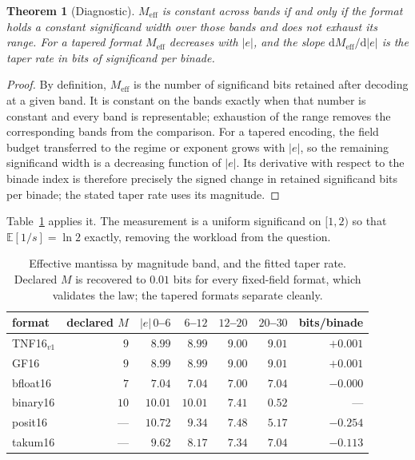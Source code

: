 \documentclass[11pt]{article}
\newtheorem{theorem}{Theorem}
\theoremstyle{definition}
\begin{document}
\begin{theorem}[Diagnostic]\label{thm:diag}
$M_{\mathrm{eff}}$ is constant across bands if and only if the format holds a
constant significand width over those bands and does not exhaust its range. For a
tapered format $M_{\mathrm{eff}}$ decreases with $|e|$, and the slope
$\mathrm{d}M_{\mathrm{eff}}/\mathrm{d}|e|$ is the taper rate in bits of
significand per binade.
\end{theorem}
\begin{proof}
By definition, $M_{\mathrm{eff}}$ is the number of significand bits retained
after decoding at a given band. It is constant on the bands exactly when that
number is constant and every band is representable; exhaustion of the range
removes the corresponding bands from the comparison. For a tapered encoding,
the field budget transferred to the regime or exponent grows with $|e|$, so the
remaining significand width is a decreasing function of $|e|$. Its derivative
with respect to the binade index is therefore precisely the signed change in
retained significand bits per binade; the stated taper rate uses its magnitude.
\end{proof}

Table~\ref{tab:meff} applies it. The measurement is a uniform significand on
$[1,2)$ so that $\mathbb{E}[1/s] = \ln 2$ exactly, removing the workload from the
question.

\begin{table}[t]\centering
\caption{Effective mantissa by magnitude band, and the fitted taper rate. Declared
$M$ is recovered to $0.01$ bits for every fixed-field format, which validates the
law; the tapered formats separate cleanly.}
\label{tab:meff}
\begin{tabular}{lrrrrrr}
\toprule
format & declared $M$ & $|e|\,0$--$6$ & $6$--$12$ & $12$--$20$ & $20$--$30$ & bits/binade \\
\midrule
TNF16$_{v1}$ & $9$  & $8.99$  & $8.99$ & $9.00$ & $9.01$ & $+0.001$ \\
GF16     & $9$  & $8.99$  & $8.99$ & $9.00$ & $9.01$ & $+0.001$ \\
bfloat16 & $7$  & $7.04$  & $7.04$ & $7.00$ & $7.04$ & $-0.000$ \\
binary16 & $10$ & $10.01$ & $10.01$ & $7.41$ & $0.52$ & --- \\
posit16  & ---  & $10.72$ & $9.34$ & $7.48$ & $5.17$ & $\mathbf{-0.254}$ \\
takum16  & ---  & $9.62$  & $8.17$ & $7.34$ & $7.04$ & $\mathbf{-0.113}$ \\
\bottomrule
\end{tabular}
\end{table}
\end{document}
